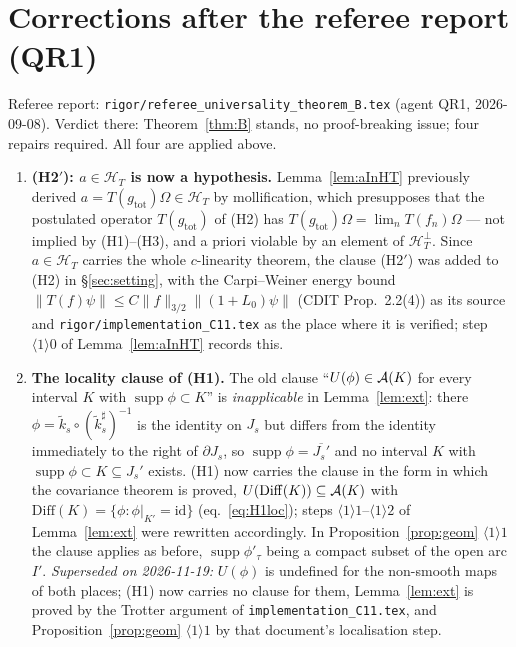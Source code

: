 \documentclass[11pt]{article}
\newcommand{\Om}{\Omega}
\newcommand{\Hil}{\mathcal H}
\newcommand{\norm}[1]{\lVert#1\rVert}
\newcommand{\HT}{\Hil_T}
\newcommand{\kt}{\widetilde k}
\newcommand{\gtot}{g_{\mathrm{tot}}}
\newcommand{\supp}{\operatorname{supp}}
\begin{document}
\section{Corrections after the referee report (QR1)}\label{sec:qr1}

Referee report: \texttt{rigor/referee\_universality\_theorem\_B.tex} (agent QR1, 2026-09-08).  Verdict there:
Theorem~\ref{thm:B} stands, no proof-breaking issue; four repairs required.  All four are applied above.

\begin{enumerate}[leftmargin=1.8em]
\item[\textbf{R1}] \textbf{(H2$'$): $a\in\HT$ is now a hypothesis.}  Lemma~\ref{lem:aInHT} previously derived
 $a=T(\gtot)\Om\in\HT$ by mollification, which presupposes that the postulated operator $T(\gtot)$ of (H2)
 has $T(\gtot)\Om=\lim_nT(f_n)\Om$ --- not implied by (H1)--(H3), and a priori violable by an element of
 $\HT^\perp$.  Since $a\in\HT$ carries the whole $c$-linearity theorem, the clause (H2$'$) was added to
 (H2) in \S\ref{sec:setting}, with the Carpi--Weiner energy bound
 $\norm{T(f)\psi}\le C\norm f_{3/2}\norm{(1+L_0)\psi}$ (CDIT Prop.~2.2(4)) as its source and
 \texttt{rigor/implementation\_C11.tex} as the place where it is verified; step
 $\langle1\rangle0$ of Lemma~\ref{lem:aInHT} records this.
\item[\textbf{R2}] \textbf{The locality clause of (H1).}  The old clause ``$U(\phi)\in\mathcal A(K)$ for every
 interval $K$ with $\supp\phi\subset K$'' is \emph{inapplicable} in Lemma~\ref{lem:ext}: there
 $\phi=\kt_s\circ(\kt^\sharp_s)^{-1}$ is the identity on $J_s$ but differs from the identity immediately to
 the right of $\partial J_s$, so $\supp\phi=\overline{J_s'}$ and no interval $K$ with
 $\supp\phi\subset K\subseteq J_s'$ exists.  (H1) now carries the clause in the form in which the
 covariance theorem is proved, $U(\mathrm{Diff}(K))\subseteq\mathcal A(K)$ with
 $\mathrm{Diff}(K)=\{\phi:\phi|_{K'}=\mathrm{id}\}$ (eq.~\eqref{eq:H1loc}); steps
 $\langle1\rangle1$--$\langle1\rangle2$ of Lemma~\ref{lem:ext} were rewritten accordingly.  In
 Proposition~\ref{prop:geom} $\langle1\rangle1$ the clause applies as before, $\supp\phi'_\tau$ being a
 compact subset of the open arc $I'$.  \emph{Superseded on 2026-11-19:} $U(\phi)$ is undefined for the non-smooth maps of both places; (H1) now carries no clause for them, Lemma~\ref{lem:ext} is proved by the Trotter argument of \texttt{implementation\_C11.tex}, and Proposition~\ref{prop:geom} $\langle1\rangle1$ by that document's localisation step.

\end{enumerate}
\end{document}
